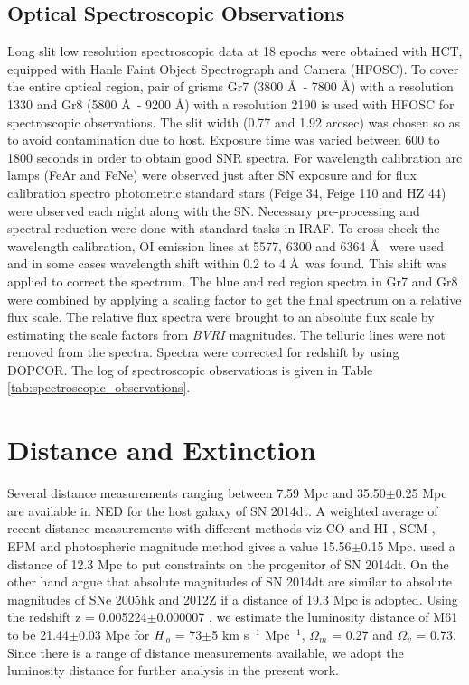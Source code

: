 \documentclass[fleqn,usenatbib]{mnras}
\begin{document}
\subsection{Optical Spectroscopic Observations}
\label{Spectroscopy}
Long slit low resolution spectroscopic data at 18 epochs were obtained with HCT, equipped with Hanle Faint Object Spectrograph and Camera (HFOSC). To cover the entire optical region, pair of grisms Gr7 (3800 \AA~- 7800 \AA) with a resolution 1330 and Gr8 (5800 \AA~- 9200 \AA) with a resolution 2190 is used with HFOSC for spectroscopic observations. The slit width (0.77 and 1.92 arcsec) was chosen so as to avoid contamination due to host. Exposure time was varied between 600 to 1800 seconds in order to obtain good SNR spectra. For wavelength calibration arc lamps (FeAr and FeNe) were observed just after SN exposure and for flux calibration spectro photometric standard stars (Feige 34, Feige 110 and HZ 44) were observed each night along with the SN. Necessary pre-processing and spectral reduction were done with standard tasks in IRAF. To cross check the wavelength calibration, OI emission lines at 5577, 6300 and 6364 \AA~ were used and in some cases wavelength shift within 0.2 to 4 \AA~was found. This shift was applied to correct the spectrum. The blue and red region spectra in Gr7 and Gr8 were combined by applying a scaling factor to get the final spectrum on a relative flux scale. The relative flux spectra were brought to an absolute flux scale by estimating the scale factors from {\it BVRI} magnitudes. The telluric lines were not removed from the spectra. Spectra were corrected for redshift by using DOPCOR. The log of spectroscopic observations is given in Table \ref{tab:spectroscopic_observations}. 

\section{Distance and Extinction } 
Several distance measurements ranging between 7.59 Mpc  \citep{1984A&AS...56..381B} and 35.50$\pm$0.25 Mpc \citep{1994ApJ...433...19S} are available in NED for the host galaxy of SN 2014dt. A weighted average of recent distance measurements with different methods viz CO and HI \citep{1997A&A...323...14S}, SCM \citep{2011ApJ...736...76R,2015ApJ...799..215P}, EPM \citep{2014ApJ...782...98B} and photospheric magnitude method \citep{2014AJ....148..107R} gives a value 15.56$\pm$0.15 Mpc. \cite{2015ApJ...798L..37F} used a distance of 12.3 Mpc to put constraints on the progenitor of SN 2014dt. On the other hand \cite{2016ApJ...816L..13F} argue that absolute magnitudes of SN 2014dt are similar to absolute magnitudes of SNe 2005hk and 2012Z if a distance of 19.3 Mpc is adopted.  Using the redshift z = 0.005224$\pm$0.000007 \citep{1985AJ.....90.1681B}, we estimate the luminosity distance of M61 to be 21.44$\pm$0.03 Mpc for $\it{H}$$_o$ = 73$\pm$5 km s$^{-1}$ Mpc$^{-1}$, $\Omega$$_m$ = 0.27 and $\Omega$$_v$ = 0.73.  Since there is a range of distance measurements available, we adopt the luminosity distance for further analysis in the present work.
\end{document}
